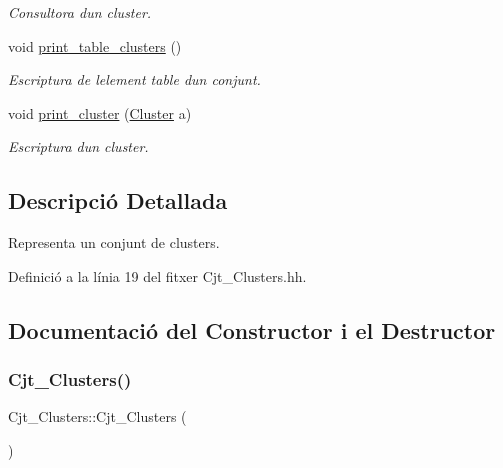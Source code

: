 \begin{DoxyCompactItemize}
\begin{DoxyCompactList}\small\item\em Consultora d\textquotesingle{}un cluster. \end{DoxyCompactList}\item 
void \hyperlink{class_cjt___clusters_acc4dd33e82c36c394acd44e60f77da22}{print\+\_\+table\+\_\+clusters} ()
\begin{DoxyCompactList}\small\item\em Escriptura de l\textquotesingle{}element table d\textquotesingle{}un conjunt. \end{DoxyCompactList}\item 
void \hyperlink{class_cjt___clusters_aa9a896c44d86f130747f1e6821a4dddd}{print\+\_\+cluster} (\hyperlink{class_cluster}{Cluster} a)
\begin{DoxyCompactList}\small\item\em Escriptura d\textquotesingle{}un cluster. \end{DoxyCompactList}\end{DoxyCompactItemize}


\subsection{Descripció Detallada}
Representa un conjunt de clusters. 

Definició a la línia 19 del fitxer Cjt\+\_\+\+Clusters.\+hh.



\subsection{Documentació del Constructor i el Destructor}
\mbox{\label{class_cjt___clusters_a2e55759944a78043744103e19dd87c1c}} 
\subsubsection{\texorpdfstring{Cjt\+\_\+\+Clusters()}{Cjt\_Clusters()}}
{\footnotesize\ttfamily Cjt\+\_\+\+Clusters\+::\+Cjt\+\_\+\+Clusters (\begin{DoxyParamCaption}{ }\end{DoxyParamCaption})}




